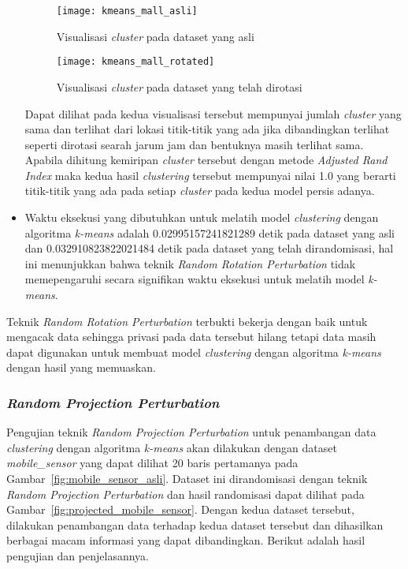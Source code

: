 \begin{itemize}
	\begin{figure}
		\centering
		\texttt{[image: kmeans\_mall\_asli]}
		\caption{Visualisasi \textit{cluster} pada dataset yang asli}
		\label{fig:kmeans_mall_asli}
	\end{figure}
	
	\begin{figure}
		\centering
		\texttt{[image: kmeans\_mall\_rotated]}
		\caption{Visualisasi \textit{cluster} pada dataset yang telah dirotasi}
		\label{fig:kmeans_mall_rotated}
	\end{figure}

	Dapat dilihat pada kedua visualisasi tersebut mempunyai jumlah \textit{cluster} yang sama dan terlihat dari lokasi titik-titik yang ada jika dibandingkan terlihat seperti dirotasi searah jarum jam dan bentuknya masih terlihat sama. Apabila dihitung kemiripan \textit{cluster} tersebut dengan metode \textit{Adjusted Rand Index} maka kedua hasil \textit{clustering} tersebut mempunyai nilai 1.0 yang berarti titik-titik yang ada pada setiap \textit{cluster} pada kedua model persis adanya.
	
	\item Waktu eksekusi yang dibutuhkan untuk melatih model \textit{clustering} dengan algoritma \textit{k-means} adalah 0.02995157241821289 detik pada dataset yang asli dan 0.032910823822021484 detik pada dataset yang telah dirandomisasi, hal ini menunjukkan bahwa teknik \textit{Random Rotation Perturbation} tidak memepengaruhi secara signifikan waktu eksekusi untuk melatih model \textit{k-means}.
\end{itemize}

Teknik \textit{Random Rotation Perturbation} terbukti bekerja dengan baik untuk mengacak data sehingga privasi pada data tersebut hilang tetapi data masih dapat digunakan untuk membuat model \textit{clustering} dengan algoritma \textit{k-means} dengan hasil yang memuaskan. 

\subsubsection{\textit{Random Projection Perturbation}}
\label{sec:pengujian-clustering-rpp}

Pengujian teknik \textit{Random Projection Perturbation} untuk penambangan data \textit{clustering} dengan algoritma \textit{k-means} akan dilakukan dengan dataset \textit{mobile\_sensor} yang dapat dilihat 20 baris pertamanya pada Gambar~\ref{fig:mobile_sensor_asli}. Dataset ini dirandomisasi dengan teknik \textit{Random Projection Perturbation} dan hasil randomisasi dapat dilihat pada Gambar~\ref{fig:projected_mobile_sensor}. Dengan kedua dataset tersebut, dilakukan penambangan data terhadap kedua dataset tersebut dan dihasilkan berbagai macam informasi yang dapat dibandingkan. Berikut adalah hasil pengujian dan penjelasannya.

